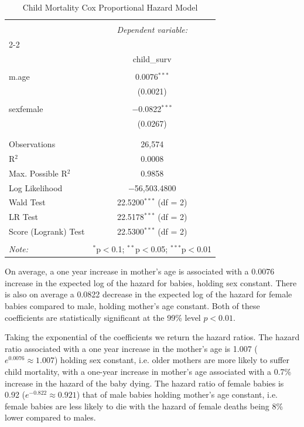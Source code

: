 \documentclass[12pt,letterpaper]{article}
\begin{document}
	\begin{table}[!htbp] \centering 
		\caption{Child Mortality Cox Proportional Hazard Model} 
		\label{} 
		\begin{tabular}{@{\extracolsep{5pt}}lc} 
			\\[-1.8ex]\hline 
			\hline \\[-1.8ex] 
			& \multicolumn{1}{c}{\textit{Dependent variable:}} \\ 
			\cline{2-2} 
			\\[-1.8ex] & child\_surv \\ 
			\hline \\[-1.8ex] 
			m.age & 0.0076$^{***}$ \\ 
			& (0.0021) \\ 
			& \\ 
			sexfemale & $-$0.0822$^{***}$ \\ 
			& (0.0267) \\ 
			& \\ 
			\hline \\[-1.8ex] 
			Observations & 26,574 \\ 
			R$^{2}$ & 0.0008 \\ 
			Max. Possible R$^{2}$ & 0.9858 \\ 
			Log Likelihood & $-$56,503.4800 \\ 
			Wald Test & 22.5200$^{***}$ (df = 2) \\ 
			LR Test & 22.5178$^{***}$ (df = 2) \\ 
			Score (Logrank) Test & 22.5300$^{***}$ (df = 2) \\ 
			\hline 
			\hline \\[-1.8ex] 
			\textit{Note:}  & \multicolumn{1}{r}{$^{*}$p$<$0.1; $^{**}$p$<$0.05; $^{***}$p$<$0.01} \\ 
		\end{tabular} 
	\end{table} 
	\FloatBarrier
	
	On average, a one year increase in mother's age is associated with a 0.0076 increase in the expected log of the hazard for babies, holding sex constant.
	There is also on average a 0.0822 decrease in the expected log of the hazard for female babies compared to male, holding mother's age constant. 
	Both of these coefficients are statistically significant at the 99\% level  $p<0.01$. 
	
	Taking the exponential of the coefficients we return the hazard ratios. 
	The hazard ratio associated with a one year increase in the mother's age is 1.007 ($e^{0.0076}\approx 1.007$) holding sex constant, i.e. older mothers are more likely to suffer child mortality, with a one-year increase in mother's age associated with a 0.7\%  increase in the hazard of the baby dying.
	The hazard ratio of female babies is 0.92 ($e^{-0.822}\approx 0.921$) that of male babies holding mother's age constant, i.e. female babies are less likely to die with the hazard of female deaths being 8\% lower compared to males. 
	
\end{document}
